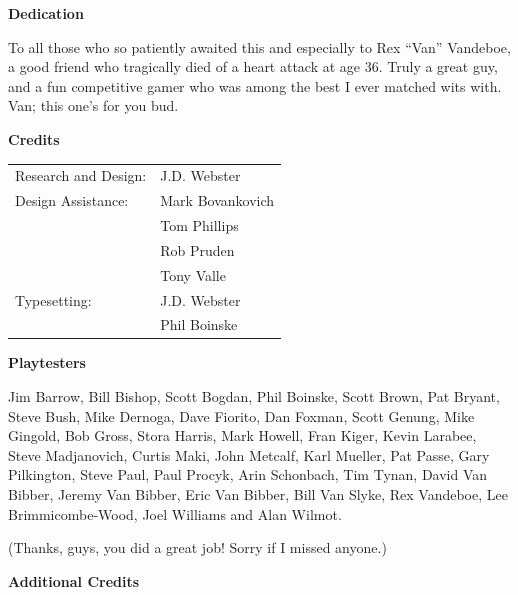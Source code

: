 \begin{center}
\textbf{\Large {} Dedication}
\end{center}

To all those who so patiently awaited this and especially to Rex “Van” Vandeboe, a good friend who tragically died of a heart attack at age 36. Truly a great guy, and a fun competitive gamer who was among the best I ever matched wits with. Van; this one’s for you bud.

\begin{center}
\textbf{\Large {} Credits}
\end{center}

\begin{tabularx}{\linewidth}{@{}LL@{}}
Research and Design: &J.D. Webster\\
Design Assistance:   &Mark Bovankovich\\
                     &Tom Phillips\\
                     &Rob Pruden\\
                     &Tony Valle\\
Typesetting:         &J.D. Webster\\
                     &Phil Boinske\\
\end{tabularx}

\begin{center}
\textbf{\Large {} Playtesters}
\end{center}

{
\sloppy
Jim Barrow, Bill Bishop, Scott Bogdan, Phil Boinske, Scott Brown, Pat Bryant, Steve Bush, Mike Dernoga, Dave Fiorito, Dan Foxman, Scott Genung, Mike Gingold, Bob Gross, Stora Harris, Mark Howell, Fran Kiger, Kevin Larabee, Steve Madjanovich, Curtis Maki, John Metcalf, Karl Mueller, Pat Passe, Gary Pilkington, Steve Paul, Paul Procyk, Arin Schonbach, Tim Tynan, David Van Bibber, Jeremy Van Bibber, Eric Van Bibber, Bill Van Slyke, Rex Vandeboe, Lee Brimmicombe-Wood, Joel Williams and Alan Wilmot.
\par
}

(Thanks, guys, you did a great job! Sorry if I missed anyone.)

\newpage

\begin{center}
\textbf{\Large Additional Credits}
\end{center}

